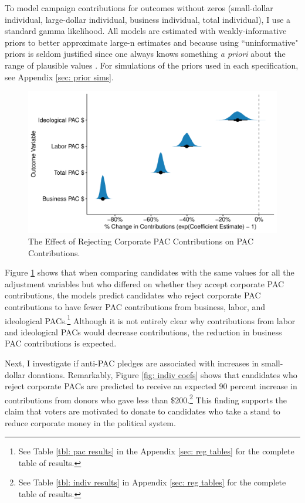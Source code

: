 \documentclass[12pt]{article}
\begin{document}
To model campaign contributions for outcomes without zeros (small-dollar individual, large-dollar individual, business individual, total individual), I use a standard gamma likelihood. All models are estimated with weakly-informative priors to better approximate large-n estimates \citep{mcneish2016} and because using ``uninformative" priors is seldom justified since one always knows something \textit{a priori} about the range of plausible values \citep{gelman2008a}. For simulations of the priors used in each specification, see Appendix \ref{sec: prior sims}.

\begin{figure}[!htb]
        \centering
        \includegraphics[width=0.75\linewidth]{pac_coef.pdf}
        \caption{The Effect of Rejecting Corporate PAC Contributions on PAC Contributions.}
        \label{fig: pac coefs}
\end{figure}

Figure \ref{fig: pac coefs} shows that when comparing candidates with the same values for all the adjustment variables but who differed on whether they accept corporate PAC contributions, the models predict candidates who reject corporate PAC contributions to have fewer PAC contributions from business, labor, and ideological PACs.\footnote{See Table \ref{tbl: pac results} in the Appendix \ref{sec: reg tables} for the complete table of results.} Although it is not entirely clear why contributions from labor and ideological PACs would decrease contributions, the reduction in business PAC contributions is expected.

Next, I investigate if anti-PAC pledges are associated with increases in small-dollar donations. Remarkably, Figure \ref{fig: indiv coefs} shows that candidates who reject corporate PACs are predicted to receive an expected 90 percent increase in contributions from donors who gave less than \$200.\footnote{See Table \ref{tbl: indiv results} in Appendix \ref{sec: reg tables} for the complete table of results.} This finding supports the claim that voters are motivated to donate to candidates who take a stand to reduce corporate money in the political system. 
\end{document}
